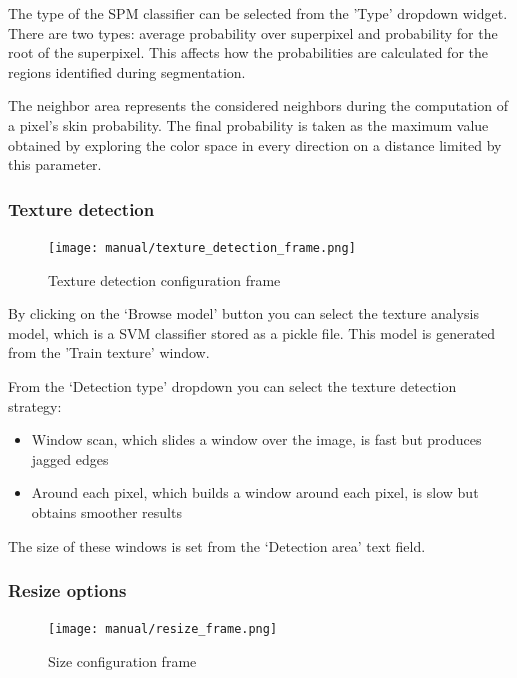 \documentclass[12pt]{report}
\begin{document}
	The type of the SPM classifier can be selected from the 'Type' dropdown widget.
	There are two types: average probability over superpixel and probability for the root of the superpixel. This affects how the probabilities are calculated for the regions identified during segmentation.
	
	The neighbor area represents the considered neighbors during the computation of a pixel's skin probability. The final probability is taken as the maximum value obtained by exploring the color space in every direction on a distance limited by this parameter. 
	
	\subsubsection{Texture detection}
	\begin{figure}
		\begin{center}
			\texttt{[image: manual/texture\_detection\_frame.png]}
		\end{center}
		\caption{Texture detection configuration frame}
	\end{figure}
	
	By clicking on the ‘Browse model’ button you can select the texture analysis model, which is a SVM classifier stored as a pickle file. This model is generated from the 'Train texture' window.
	
	From the ‘Detection type’ dropdown you can select the texture detection strategy:
	\begin{itemize}
		\item Window scan, which slides a window over the image, is fast but produces jagged edges
		\item Around each pixel, which builds a window around each pixel, is slow but obtains smoother results
	\end{itemize}
	
	The size of these windows is set from the ‘Detection area’ text field.
	
	\subsubsection{Resize options}
	
	\begin{figure}
		\begin{center}
			\texttt{[image: manual/resize\_frame.png]}
		\end{center}
		\caption{Size configuration frame}
	\end{figure}
	
\end{document}
